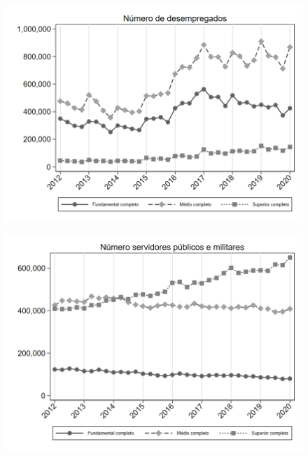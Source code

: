 \begin{frame}[label=_composicao_demografica_educacao_n_de_desemprego]{}
\textit{\hyperlink{_composicao_demografica_educacao}{}}
\begin{figure}
  \centering
  \includegraphics[width=1.0\linewidth]{../../analysis/output/composicao_demografica/educacao/_composicao_demografica_educacao_n_de_desemprego.png}
  \caption{}
  \label{fig:_composicao_demografica_educacao_n_de_desemprego}
\end{figure}
\end{frame}

\begin{frame}[label=_composicao_demografica_educacao_n_militar]{}
\textit{\hyperlink{_composicao_demografica_educacao}{}}
\begin{figure}
  \centering
  \includegraphics[width=1.0\linewidth]{../../analysis/output/composicao_demografica/educacao/_composicao_demografica_educacao_n_militar.png}
  \caption{}
  \label{fig:_composicao_demografica_educacao_n_militar}
\end{figure}
\end{frame}


